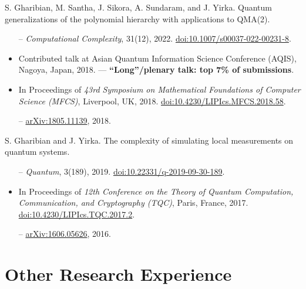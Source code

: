 \documentclass[11pt,letterpaper,serif]{moderncv}
\newcommand{\pubItemSep}{0em}
\begin{document}
S. Gharibian, M. Santha, J. Sikora, A. Sundaram, and J. Yirka.\quad
Quantum generalizations of the polynomial hierarchy with applications to QMA(2).
\begin{adjustwidth}{.25in}{}
	\begin{itemize}
		\item[--] \textit{Computational Complexity}, 31(12), 2022.\quad
		\href{https://doi.org/10.1007/s00037-022-00231-8}{doi:10.1007/s00037-022-00231-8}.
		\item Contributed talk at Asian Quantum Information Science Conference (AQIS), Nagoya, Japan, 2018. --- \textbf{``Long''/plenary talk: top 7\% of submissions}.
		\item In Proceedings of \textit{43rd Symposium on Mathematical Foundations of Computer Science (MFCS)}, Liverpool, UK, 2018. \quad
		\href{https://doi.org/10.4230/LIPIcs.MFCS.2018.58}{doi:10.4230/LIPIcs.MFCS.2018.58}.
		\item[--] \href{https://arxiv.org/abs/1805.11139}{arXiv:1805.11139}, 2018.
	\end{itemize}
\end{adjustwidth}
\medskip

S. Gharibian and J. Yirka.\quad
The complexity of simulating local measurements on quantum systems.
\begin{adjustwidth}{.25in}{}
	\begin{itemize}[itemsep=\pubItemSep]
		\item[--] \textit{Quantum}, 3(189), 2019. \quad
		\href{https://doi.org/10.22331/q-2019-09-30-189}{doi:10.22331/q-2019-09-30-189}.
		\item In Proceedings of \textit{12th Conference on the Theory of Quantum Computation, Communication,
		and Cryptography (TQC)}, Paris, France, 2017. \quad
		\href{https://doi.org/10.4230/LIPIcs.TQC.2017.2}{doi:10.4230/LIPIcs.TQC.2017.2}.
		\item[--] \href{https://arxiv.org/abs/1606.05626}{arXiv:1606.05626}, 2016.
	\end{itemize}
\end{adjustwidth}

\section{Other Research Experience}
\end{document}
